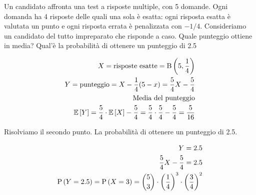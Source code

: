 \begin{exrc}
    Un candidato affronta una test a risposte multiple, con 5 domande. Ogni domanda ha 4 risposte delle quali una sola \`e esatta: ogni risposta esatta \`e valutata un punto e ogni risposta errata \`e penalizzata con \(-1/4\). Consideriamo un candidato del tutto impreparato che risponde a caso. Quale punteggio ottiene in media? Qual'\`e la probabilit\`a di ottenere un punteggio di 2.5

    \begin{equation*}
        \begin{aligned}
            X = \text{risposte esatte} = \text{B}\left(5,\frac{1}{4}\right) \\
            Y = \text{punteggio} = X - \frac{1}{4} (5-x) = \frac{5}{4}X - \frac{5}{4} \\
            \text{Media del punteggio} \\
            \mathbb{E}\left[Y\right] = \frac{5}{4} \cdot \mathbb{E}\left[X\right] - \frac{5}{4} = \frac{5}{4} \cdot \frac{5}{4} - \frac{5}{4} = \frac{5}{16} \\
        \end{aligned}
    \end{equation*}

    Risolviamo il secondo punto. La probabilit\`a di ottenere un punteggio di 2.5.

    \begin{equation*}
        \begin{aligned}
            Y = 2.5 \\
            \frac{5}{4}X - \frac{5}{4} = 2.5 \\
            \text{P}\left(Y = 2.5\right) = \text{P}\left(X = 3\right) = \binom{5}{3} \cdot \left( \frac{1}{4} \right)^3 \cdot \left( \frac{3}{4} \right)^2
        \end{aligned}
    \end{equation*}

\end{exrc}